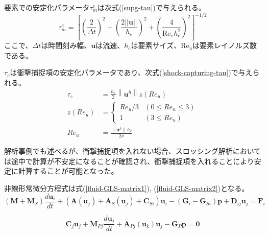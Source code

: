 要素での安定化パラメータ$\tau_{m}^{e}$は次式(\ref{supg-tau})で与えられる。
\begin{equation}
\label{supg-tau}
	\tau_{m}^{e}=\left[ \left(\frac{2}{\Delta t}\right)^{2} + \left(\frac{2||\bm{u}||}{h_{e}}\right)^{2} + \left(\frac{4}{\mathrm{Re_{v}} h_{e}^{2}}\right)^{2}\right]^{-1/2}
\end{equation}
ここで、$\Delta t$は時間刻み幅、$\bm{u}$は流速、$h_e$は要素サイズ、$\mathrm{Re_u}$は要素レイノルズ数である。

$\tau_{c}$は衝撃捕捉項の安定化パラメータであり、次式(\ref{shock-capturing-tau})で与えられる。
\begin{equation}
\label{shock-capturing-tau}
	\begin{aligned} 
		\tau_c & =\frac{h_e}{2}\left\|\bm{u}^h\right\| z\left(R e_u\right) \\ 
		z\left(R e_u\right) & = 
			\begin{cases}
				R e_u / 3 & \left(0 \leq R e_u \leq 3\right) \\ 
				1         & \left(3 \leq R e_u\right)
			\end{cases} \\
		Re_{u} & = \frac{\| \bm{u}^{h} \| h_{e}}{2 \nu}
	\end{aligned}
\end{equation}

解析事例でも述べるが、衝撃捕捉項を入れない場合、スロッシング解析においては途中で計算が不安定になることが確認され、衝撃捕捉項を入れることにより安定に計算することが可能となった。

非線形常微分方程式は式(\ref{fluid-GLS-matrix1}), (\ref{fluid-GLS-matrix2})となる。
\begin{equation}
\label{fluid-GLS-matrix1}
	\left(\bm{M}+\bm{M}_S\right) \frac{d \bm{u}_i}{d t} 
	+ \left(\bm{A}\left(\bm{u}_j\right) + \bm{A}_S\left(\bm{u}_j\right) + \bm{C}_{Si} \right) \bm{u}_i
	- \left(\bm{G}_i-\bm{G}_{S i}\right) \bm{p}
	+ \bm{D}_{i j} \bm{u}_j=\bm{F}_i
\end{equation}

\begin{equation}
\label{fluid-GLS-matrix2}
	\bm{C}_j \bm{u}_j+\bm{M}_{P j} \frac{d \bm{u}_j}{d t}
	+ \bm{A}_{P j}\left(\bm{u}_k\right) \bm{u}_j
	- \bm{G}_P \bm{p}=\mathbf{0}
\end{equation}


